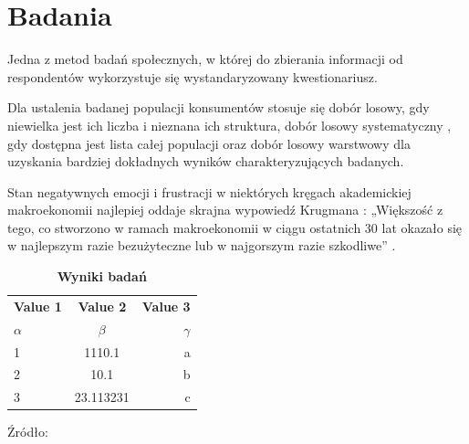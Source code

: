 \section{Badania}

Jedna z metod badań społecznych, w której do zbierania informacji od respondentów wykorzystuje się wystandaryzowany kwestionariusz. \cite{French2010a}

Dla ustalenia badanej populacji konsumentów \cite{nbp2012} stosuje się dobór losowy, gdy niewielka jest ich liczba i nieznana ich struktura, dobór losowy systematyczny \cite{nbp2012}, gdy dostępna jest lista całej populacji oraz dobór losowy \cite{systems2001} warstwowy dla uzyskania bardziej dokładnych wyników charakteryzujących badanych. \cite{Shotton2000, French2010, Shotton2010, Shotton1989, French2010a, Shotton1999}

Stan negatywnych emocji i frustracji w niektórych kręgach akademickiej makroekonomii \textcite[25]{krugman2009} najlepiej oddaje skrajna wypowiedź Krugmana \parencite*{krugman2009}: „Większość z tego, co stworzono w ramach makroekonomii w ciągu ostatnich 30 lat okazało się w najlepszym razie bezużyteczne lub w najgorszym razie szkodliwe” .

\begin{table}[h!]
	\begin{center}
		\caption{{\bfseries Wyniki badań}}
		\label{tab:table1}
		\begin{tabular}{l|c|r} %
			\textbf{Value 1} & \textbf{Value 2} & \textbf{Value 3}\\
			$\alpha$ & $\beta$ & $\gamma$ \\
			\hline
			1 & 1110.1 & a\\
			2 & 10.1 & b\\
			3 & 23.113231 & c\\
		\end{tabular}
	\end{center}
	\begin{center}
	    \footnotesize{Źródło: \protect\cite{Shotton1999}}
	\end{center}
\end{table}